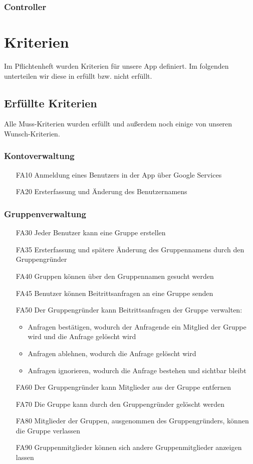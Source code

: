 \documentclass{scrartcl}
\begin{document}
	\subsubsection{Controller}
	\newpage
	\section{Kriterien}
	Im Pflichtenheft wurden Kriterien für unsere App definiert. Im folgenden unterteilen wir diese in erfüllt bzw. nicht erfüllt.

	
	\subsection{Erfüllte Kriterien}
		Alle Muss-Kriterien wurden erfüllt und außerdem noch einige von unseren Wunsch-Kriterien.
		
	\subsubsection{Kontoverwaltung}
	\begin{itemize}
		\item[FA10] Anmeldung eines Benutzers in der App über Google Services
		\item[FA20] Ersterfassung und Änderung des Benutzernamens
	\end{itemize}
	
	\subsubsection{Gruppenverwaltung}
	\begin{itemize}
		\item[FA30] Jeder Benutzer kann eine Gruppe erstellen
		\item[FA35] Ersterfassung und spätere Änderung des Gruppennamens durch den Gruppengründer
		\item[FA40] Gruppen können über den Gruppennamen gesucht werden
		\item[FA45] Benutzer können Beitrittsanfragen an eine Gruppe senden
		\item[FA50] Der Gruppengründer kann Beitrittsanfragen der Gruppe verwalten:
		\begin{itemize}
			\item Anfragen bestätigen, wodurch der Anfragende ein Mitglied der Gruppe wird und die Anfrage gelöscht wird
			\item Anfragen ablehnen, wodurch die Anfrage gelöscht wird
			\item Anfragen ignorieren, wodurch die Anfrage bestehen und sichtbar bleibt
		\end{itemize}
		\item[FA60] Der Gruppengründer kann Mitglieder aus der Gruppe entfernen
		\item[FA70] Die Gruppe kann durch den Gruppengründer gelöscht werden
		\item[FA80] Mitglieder der Gruppen, ausgenommen des Gruppengründers, können die Gruppe verlassen
		\item[FA90] Gruppenmitglieder können sich andere Gruppenmitglieder anzeigen lassen
	\end{itemize}
	
\end{document}
